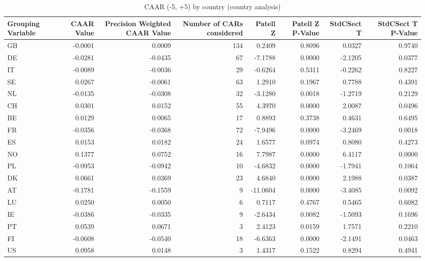 \begin{table}
\caption{CAAR (-5, +5) by country (country analysis)}
\label{tab:country_caar}
\begin{tabular}{lrrrrrrr}
\toprule
Grouping Variable & CAAR Value & Precision Weighted CAAR Value & Number of CARs considered & Patell Z & Patell Z P-Value & StdCSect T & StdCSect T P-Value \\
\midrule
GB & -0.0001 & 0.0009 & 134 & 0.2409 & 0.8096 & 0.0327 & 0.9740 \\
DE & -0.0281 & -0.0435 & 67 & -7.1788 & 0.0000 & -2.1205 & 0.0377 \\
IT & -0.0089 & -0.0036 & 29 & -0.6264 & 0.5311 & -0.2262 & 0.8227 \\
SE & 0.0267 & -0.0061 & 63 & 1.2910 & 0.1967 & 0.7788 & 0.4391 \\
NL & -0.0135 & -0.0308 & 32 & -3.1280 & 0.0018 & -1.2719 & 0.2129 \\
CH & 0.0301 & 0.0152 & 55 & 4.3970 & 0.0000 & 2.0087 & 0.0496 \\
BE & 0.0129 & 0.0065 & 17 & 0.8893 & 0.3738 & 0.4631 & 0.6495 \\
FR & -0.0356 & -0.0368 & 72 & -7.9496 & 0.0000 & -3.2469 & 0.0018 \\
ES & 0.0153 & 0.0182 & 24 & 1.6577 & 0.0974 & 0.8080 & 0.4273 \\
NO & 0.1377 & 0.0752 & 16 & 7.7987 & 0.0000 & 6.4117 & 0.0000 \\
PL & -0.0953 & -0.0942 & 10 & -4.6832 & 0.0000 & -1.7941 & 0.1064 \\
DK & 0.0661 & 0.0369 & 23 & 4.6840 & 0.0000 & 2.1988 & 0.0387 \\
AT & -0.1781 & -0.1559 & 9 & -11.0604 & 0.0000 & -3.4085 & 0.0092 \\
LU & 0.0250 & 0.0050 & 6 & 0.7117 & 0.4767 & 0.5465 & 0.6082 \\
IE & -0.0386 & -0.0335 & 9 & -2.6434 & 0.0082 & -1.5093 & 0.1696 \\
PT & 0.0539 & 0.0671 & 3 & 2.4123 & 0.0159 & 1.7571 & 0.2210 \\
FI & -0.0608 & -0.0540 & 18 & -6.6363 & 0.0000 & -2.1491 & 0.0463 \\
US & 0.0958 & 0.0148 & 3 & 1.4317 & 0.1522 & 0.8294 & 0.4941 \\
\bottomrule
\end{tabular}
\end{table}
